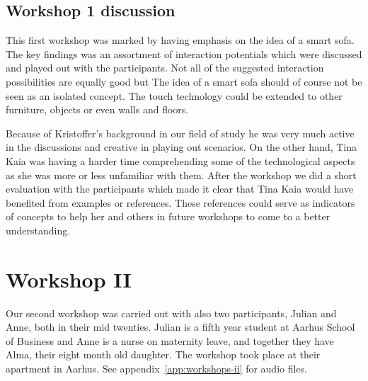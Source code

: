 \subsection{Workshop 1 discussion}
\label{ch:workshops:workshop-i:discussion}

This first workshop was marked by having emphasis on the idea of a smart sofa.
The key findings was an assortment of interaction potentials which were discussed and played out with the participants.
Not all of the suggested interaction possibilities are equally good but \todo{\dots}
The idea of a smart sofa should of course not be seen as an isolated concept.
The touch technology could be extended to other furniture, objects or even walls and floors.

Because of Kristoffer's background in our field of study he was very much active in the discussions and creative in playing out scenarios.
On the other hand, Tina Kaia was having a harder time comprehending some of the technological aspects as she was more or less unfamiliar with them.
After the workshop we did a short evaluation with the participants which made it clear that Tina Kaia would have benefited from examples or references.
These references could serve as indicators of concepts to help her and others in future workshops to come to a better understanding.

\section{Workshop II}
\label{ch:workshops:workshop-ii}
Our second workshop was carried out with also two participants, Julian and Anne, both in their mid twenties.
Julian is a fifth year student at Aarhus School of Business and Anne is a nurse on maternity leave, and together they have Alma, their eight month old daughter.
The workshop took place at their apartment in Aarhus.
See appendix~\ref{app:workshops-ii} for audio files.

